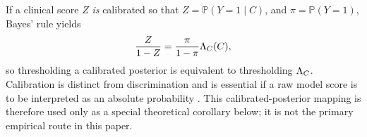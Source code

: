 If a clinical score $Z$ \emph{is} calibrated so that $Z=\mathbb{P}(Y=1\mid C)$, and $\pi=\mathbb{P}(Y=1)$, Bayes' rule yields
\begin{equation}
\frac{Z}{1-Z}
=\frac{\pi}{1-\pi}\Lambda_C(C),
\label{eq:zlr}
\end{equation}
so thresholding a calibrated posterior is equivalent to thresholding $\Lambda_C$. Calibration is distinct from discrimination and is essential if a raw model score is to be interpreted as an absolute probability \cite{VanCalster2019}. This calibrated-posterior mapping is therefore used only as a special theoretical corollary below; it is not the primary empirical route in this paper.
